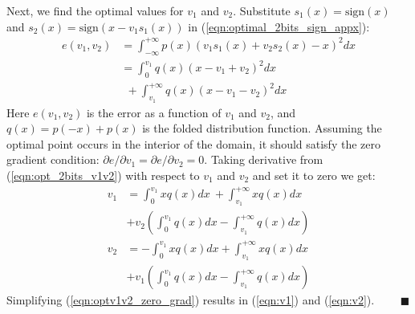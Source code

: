 \documentclass[10pt,twocolumn,letterpaper]{article}
\newcommand{\qed}{\blacksquare}
\begin{document}
Next, we find the optimal values for $v_1$ and $v_2$. Substitute $s_1(x) = \text{sign}(x)$ and $s_2(x) = \text{sign}(x - v_1 s_1(x))$ in (\ref{eqn:optimal_2bits_sign_appx}):
\begin{equation} \label{eqn:opt_2bits_v1v2}
\begin{aligned}
e(v_1, v_2) &= \int_{-\infty}^{+\infty} p(x)\left(v_1 s_1(x) + v_2 s_2(x)  - x\right)^2 dx\\ 
&=\int_{0}^{v_1} q(x) (x - v_1 + v_2)^2 dx\\
&~~+ \int_{ v_1}^{+ \infty} q(x) (x - v_1 - v_2)^2 dx
\end{aligned}
\end{equation}
Here $e(v_1, v_2)$ is the error as a function of $v_1$ and $v_2$, and $q(x) = p(-x) + p(x)$ is the folded distribution function. Assuming the optimal point occurs in the interior of the domain, it should satisfy the zero gradient condition: $\partial e / \partial v_1 = \partial e / \partial v_2 = 0$. Taking derivative from (\ref{eqn:opt_2bits_v1v2}) with respect to $v_1$ and $v_2$ and set it to zero we get:
\begin{equation}\label{eqn:optv1v2_zero_grad}
 \begin{aligned}
v_1 &= \int_{0}^{v_1} xq(x)dx ~+ \int_{v_1}^{+\infty} xq(x)dx\\
~~&+ v_2 \left( \int_{0}^{v_1} q(x) dx - \int_{v_1}^{+\infty} q(x)dx \right) \\
v_2 &= -\int_{0}^{v_1} xq(x)dx + \int_{v_1}^{+\infty}xq(x)dx\\
~~&+ v_1\left(\int_{0}^{v_1} q(x)dx  - \int_{v_1}^{+\infty} q(x)dx  \right)
 \end{aligned}
\end{equation}
Simplifying (\ref{eqn:optv1v2_zero_grad}) results in (\ref{eqn:v1}) and (\ref{eqn:v2}). $\quad\quad\qed$

\end{document}
